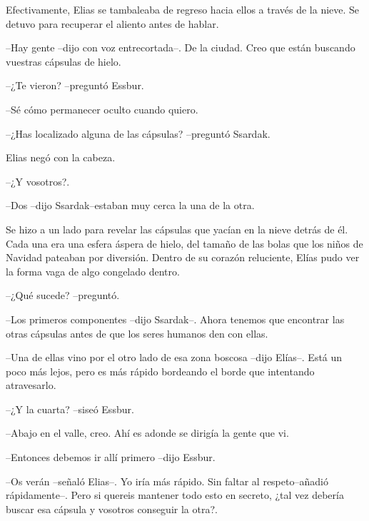 Efectivamente, Elias se tambaleaba de regreso hacia ellos a través de la nieve. Se detuvo para recuperar el aliento antes de hablar. 


--Hay gente --dijo con voz entrecortada--. De la ciudad. Creo que están buscando vuestras cápsulas de hielo.



--¿Te vieron? --preguntó Essbur.



--Sé cómo permanecer oculto cuando quiero.



--¿Has localizado alguna de las cápsulas? --preguntó Ssardak.



Elias negó con la cabeza. 


--¿Y vosotros?.



--Dos --dijo Ssardak--estaban muy cerca la una de la otra.



Se hizo a un lado para revelar las cápsulas que yacían en la nieve detrás de él. Cada una era una esfera áspera de hielo, del tamaño de las bolas que los niños de Navidad pateaban por diversión. Dentro de su corazón reluciente, Elías pudo ver la forma vaga de algo congelado dentro.



--¿Qué sucede? --preguntó.



--Los primeros componentes --dijo Ssardak--. Ahora tenemos que encontrar las otras cápsulas  antes de que los seres humanos den con ellas.



--Una de ellas vino por el otro lado de esa zona boscosa --dijo Elías--. Está un poco más lejos, pero es más rápido bordeando el borde que intentando atravesarlo.


--¿Y la cuarta? --siseó Essbur.



--Abajo en el valle, creo. Ahí es adonde se dirigía la gente que vi.



--Entonces debemos ir allí primero --dijo Essbur.



--Os verán --señaló Elias--. Yo iría más rápido. Sin faltar al respeto--añadió rápidamente--. Pero si quereis mantener todo esto en secreto, ¿tal vez debería buscar esa cápsula y vosotros conseguir la otra?.



